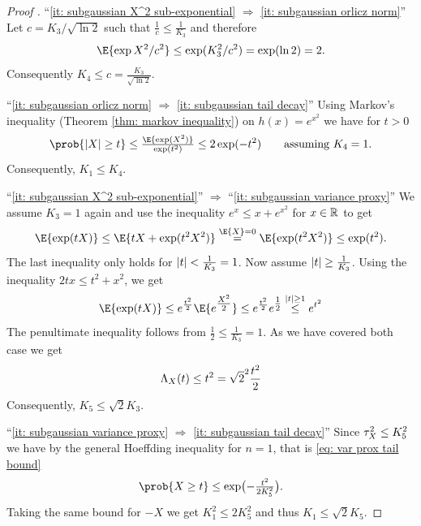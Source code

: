 \begin{proof}[Proof {\citep[Prop.~2.5.2]{vershyninHighDimensionalProbabilityIntroduction2018}}]
    ``\ref{it: subgaussian X^2 sub-exponential} \(\Rightarrow\) \ref{it: subgaussian orlicz norm}''
    Let \(c=K_3/\sqrt{\ln 2}\) such that \(\frac1c \le \frac1{K_3}\)
    and therefore
    \[
        \E{\exp{X^2/c^2}} \le \exp(K_3^2/c^2) = \exp(\ln 2) = 2.
    \]
    Consequently \(K_4 \le c= \frac{K_3}{\sqrt{\ln 2}}\).
    
    ``\ref{it: subgaussian orlicz norm} \(\Rightarrow\) \ref{it: subgaussian
    tail decay}'' Using Markov's inequality (Theorem \ref{thm: markov
    inequality}) on \(h(x) = e^{x^2}\) we have for \(t > 0\)
    \[
        \prob{\abs{X} \ge t} \le \tfrac{\E{\exp(X^2)}}{\exp(t^2)}
        \le 2 \exp(-t^2) \qquad \text{assuming } K_4 = 1.
    \]
    Consequently, \(K_1 \le K_4\).

    ``\ref{it: subgaussian X^2 sub-exponential}'' \(\Rightarrow\) ``\ref{it: subgaussian variance proxy}''
    We assume \(K_3=1\) again
    and use the inequality \(e^x \le x + e^{x^2}\) for \(x\in \mathbb{R}\) to get
    \[
        \E{\exp(t X)}
        \le \E{t X + \exp(t^2 X^2)}
        \overset{\E{X}=0}= \E{\exp(t^2 X^2)}
        \le \exp(t^2).
    \]
    The last inequality only holds for \(\lvert t\rvert < \frac1{K_3} = 1\). Now assume
    \(\lvert t\rvert \ge \frac1{K_3}\). Using the inequality \(2tx \le t^2 + x^2\), we get
    \[
        \E{\exp(t X)}
        \le e^{\frac{t^2}2}\E{e^{\tfrac{X^2}2}}
        \le e^{\frac{t^2}2} e^{\tfrac12} \overset{\abs{t}\ge 1}\le e^{t^2}
    \]
    The penultimate inequality follows from \(\frac12 \le \frac1{K_3} =1\).
    As we have covered both case we get
    \[
        \Lambda_X(t) \le t^2 = \sqrt{2}^2 \frac{t^2}2
    \]
    Consequently, \(K_5 \le \sqrt{2}K_3\).

    ``\ref{it: subgaussian variance proxy} \(\Rightarrow\) \ref{it: subgaussian tail decay}''
    Since \(\tau^2_{X} \le K_5^2\) we have by the general Hoeffding inequality for \(n=1\), that is \eqref{eq: var prox tail bound}
    \[
        \prob{X \ge t} \le \exp\bigl(-\tfrac{t^2}{2K_5^2}\bigr).
    \]
    Taking the same bound for \(-X\) we get \(K_1^2 \le 2K_5^2\) and thus \(K_1 \le \sqrt{2} K_5\).
\end{proof}

